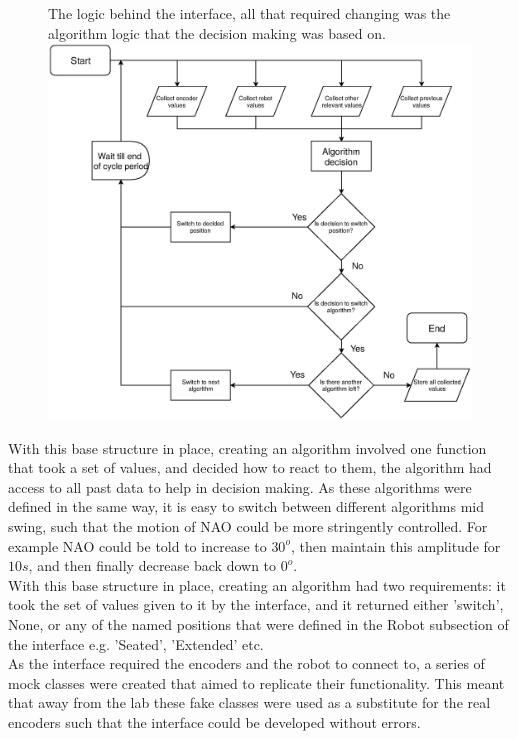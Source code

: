 \documentclass[11pt]{article}
\begin{document}
    \begin{figure}[!htb]
        \centering
        \captionbox
             {The logic behind the interface, all that required changing was the algorithm logic that the decision making was based on.\label{fig:InterfaceLogic}}
             {\includegraphics[width=1.0\textwidth]{InterfaceLogic.eps}}
    \end{figure}

With this base structure in place, creating an algorithm involved one function that took a set of values, and decided how to react to them, the algorithm had access to all past data to help in decision making. As these algorithms were defined in the same way, it is easy to switch between different algorithms mid swing, such that the motion of NAO could be more stringently controlled. For example NAO could be told to increase to $30^o$, then maintain this amplitude for $10s$, and then finally decrease back down to $0^o$.\\

With this base structure in place, creating an algorithm had two requirements: it took the set of values given to it by the interface, and it returned either 'switch', None, or any of the named positions that were defined in the Robot subsection of the interface e.g. 'Seated', 'Extended' etc.\\

As the interface required the encoders and the robot to connect to, a series of mock classes were created that aimed to replicate their functionality. This meant that away from the lab these fake classes were used as a substitute for the real encoders such that the interface could be developed without errors.
\end{document}
